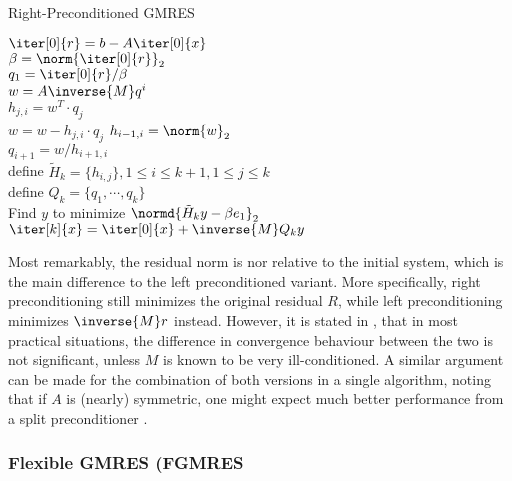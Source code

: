 \begin{algorithm}[h]
  \caption{Right-Preconditioned GMRES}
  \label{alg:predonditioned_gmres}
  \SetAlgoLined
  \DontPrintSemicolon
  $\iter[0]{r} = b-A\iter[0]{x}$ \\
  $\beta = \norm{\iter[0]{r}}_2$ \\
  $q_1 = \iter[0]{r}/\beta$ \\
   {
    $w =A\inverse{M} q^i$ \\
     {
      $h_{j,i} = w^T\cdot q_j$ \\
      $ w = w - h_{j,i}\cdot q_j$}
    $h_{i-1,i} = \norm{w}_2$ \\
    $q_{i+1} = w/h_{i+1,i}$ \\
  }
  define $\tilde{H}_k = \{h_{i,j}\}, 1 \leq i \leq k+1, 1 \leq j \leq k$ \\
  define $Q_k = \{q_1, \cdots, q_k\}$ \\
  Find $y$ to minimize $\normd{\tilde{H}_ky-\beta e_1}_2$ \\
  $\iter[k]{x} = \iter[0]{x} + \inverse{M}Q_ky$
\end{algorithm}

Most remarkably, the residual norm is nor relative to the initial system, which is the main difference to the left preconditioned variant. More specifically, right preconditioning still minimizes the original residual $R$, while left preconditioning minimizes $\inverse{M}r$ instead. However, it is stated in \cite{saad_iterative_2003}, that in most practical situations, the difference in convergence behaviour between the two is not significant, unless $M$ is known to be very ill-conditioned. A similar argument can be made for the combination of both versions in a single algorithm, noting that if $A$ is (nearly) symmetric, one might expect much better performance from a split preconditioner \cite{saad_iterative_2003}.

\subsubsection{Flexible GMRES (FGMRES}
\label{sec:fgmres}


